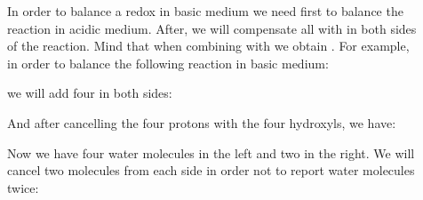 \documentclass[main.tex]{subfiles} %
\begin{document}
\begin{description}
 \item[] In order to balance a redox in basic medium we need first to balance the reaction in acidic medium. After, we will compensate all  with  in both sides of the reaction. Mind that when combining  with  we obtain . For example, in order to balance the following reaction in basic medium:
\begin{center}\end{center}
we will add four  in both sides:
\begin{center}\end{center}
And after cancelling the four protons with the four hydroxyls, we have:
\begin{center}\end{center}
Now we have four water molecules in the left and two in the right. We will cancel two molecules from each side in order not to report water molecules twice:
\begin{center}\end{center}





\end{description}
\end{document}
